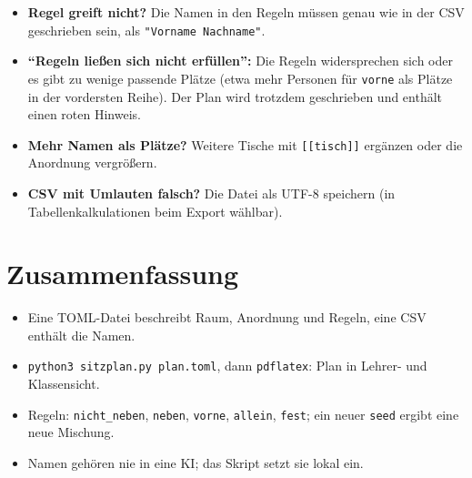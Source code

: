 \begin{itemize}
	\item \textbf{Regel greift nicht?} Die Namen in den Regeln müssen genau wie in der CSV geschrieben sein, als \texttt{"Vorname Nachname"}.
	\item \textbf{\enquote{Regeln ließen sich nicht erfüllen}:} Die Regeln widersprechen sich oder es gibt zu wenige passende Plätze (etwa mehr Personen für \texttt{vorne} als Plätze in der vordersten Reihe). Der Plan wird trotzdem geschrieben und enthält einen roten Hinweis.
	\item \textbf{Mehr Namen als Plätze?} Weitere Tische mit \texttt{[[tisch]]} ergänzen oder die Anordnung vergrößern.
	\item \textbf{CSV mit Umlauten falsch?} Die Datei als UTF-8 speichern (in Tabellenkalkulationen beim Export wählbar).
\end{itemize}



\section{Zusammenfassung}

\begin{itemize}
	\item Eine TOML-Datei beschreibt Raum, Anordnung und Regeln, eine CSV enthält die Namen.
	\item \texttt{python3 sitzplan.py plan.toml}, dann \texttt{pdflatex}: Plan in Lehrer- und Klassensicht.
	\item Regeln: \texttt{nicht\_neben}, \texttt{neben}, \texttt{vorne}, \texttt{allein}, \texttt{fest}; ein neuer \texttt{seed} ergibt eine neue Mischung.
	\item Namen gehören nie in eine KI; das Skript setzt sie lokal ein.
\end{itemize}


